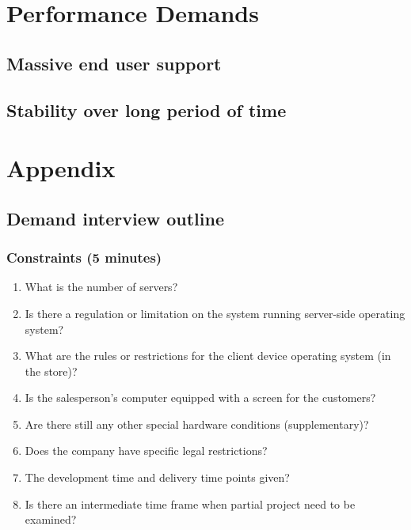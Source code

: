 \documentclass[a4paper]{report}
\begin{document}
\chapter{Performance Demands}

\section{Massive end user support}

\section{Stability over long period of time}

\chapter{Appendix}
\section{Demand interview outline}
\subsection{Constraints (5 minutes)}
\begin{enumerate}
\item What is the number of servers? 
\item Is there a regulation or limitation on the system running server-side operating system? 
\item What are the rules or restrictions for the client device operating system (in the store)? 
\item Is the salesperson's computer equipped with a screen for the customers?
\item Are there still any other special hardware conditions (supplementary)? 
\item Does the company have specific legal restrictions? 
\item The development time and delivery time points given? 
\item Is there an intermediate time frame when partial project need to be examined?
\end{enumerate}
\end{document}
